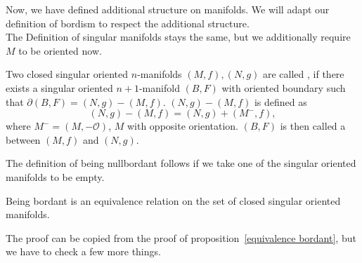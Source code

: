 \documentclass[a4paper,11pt]{article}
\begin{document}
Now, we have defined additional structure on manifolds.
We will adapt our definition of bordism to respect the additional structure.\\
The Definition of singular manifolds stays the same, but we additionally require \(M\) to be oriented now.

\begin{definition}
    Two closed singular oriented \(n\)-manifolds \((M,f),(N,g)\) are called , if there exists a singular oriented \(n+1\)-manifold \((B,F)\) with oriented boundary such that \(\partial (B,F) = (N,g)-(M,f)\). \((N,g)-(M,f)\) is defined as
    \[(N,g)-(M,f)=(N,g)+(M^-,f),\]
    where \(M^-=(M,-\mathcal{O})\), \(M\) with opposite orientation. \((B,F)\) is then called a  between \((M,f)\) and \((N,g)\).
\end{definition}

\begin{remark}
    The definition of being nullbordant follows if we take one of the singular oriented manifolds to be empty.
\end{remark}

\begin{proposition}\label{oriented eq. rel}
    Being bordant is an equivalence relation on the set of closed singular oriented manifolds.
\end{proposition}

The proof can be copied from the proof of proposition\ \ref{equivalence bordant}, but we have to check a few more things.
\end{document}
